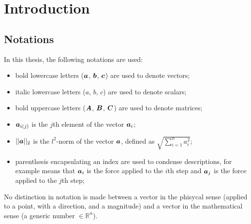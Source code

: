 \chapter{Introduction}
\label{ch:introduction}
\section{Notations}
\label{sec:notations}
In this thesis, the following notations are used:
\begin{itemize}
  \item bold lowercase letters ($\bm{a}$, $\bm{b}$, $\bm{c}$) are used to denote vectors;
  \item italic lowercase letters ($a$, $b$, $c$) are used to denote scalars;
  \item bold uppercase letters ($\bm{A}$, $\bm{B}$, $\bm{C}$) are used to denote matrices;
  \item $\bm{a}_{i(j)}$ is the $j$th element of the vector $\bm{a}_i$;
  \item $||\bm{a}||_2$ is the $l^2$-norm of the vector $\bm{a}$, defined as $\sqrt{\sum_{i=1}^{n} a_i^2}$;
  \item parenthesis encapsulating an index are used to condense descriptions, for example  means that $\bm{a}_i$ is the force applied to the $i$th step and $\bm{a}_j$ is the force applied to the $j$th step;
\end{itemize}

No distinction in notation is made between a vector in the phisycal sense (applied to a point, with a direction, and a magnitude) and a vector in the mathematical sense (a generic number $\in \mathbb{R}^n $).


%  

%  

%  

